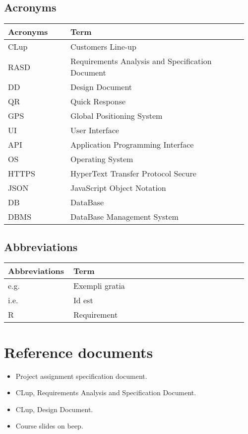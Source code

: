 \subsection{Acronyms}
\begin{center}
	\begin{tabular}{@{}p{0.25\linewidth} p{0.71\linewidth}@{}}
		\toprule
		\textbf{Acronyms} & \textbf{Term}\\
		\midrule
		CLup & Customers Line-up\\
		RASD & Requirements Analysis and Specification Document\\
		DD & Design Document\\
		QR & Quick Response\\
		GPS & Global Positioning System\\
		UI & User Interface\\
		API & Application Programming Interface\\
		OS & Operating System\\
		HTTPS & HyperText Transfer Protocol Secure\\
		JSON & JavaScript Object Notation\\	
		DB & DataBase\\
		DBMS & DataBase Management System\\
		\bottomrule
	\end{tabular}
\end{center}

\subsection{Abbreviations}
\begin{center}
	\begin{tabular}{@{}p{0.25\linewidth} p{0.71\linewidth}@{}}
		\toprule
		\textbf{Abbreviations} & \textbf{Term}\\
		\midrule
		e.g. & Exempli gratia\\
		i.e. & Id est\\
		R & Requirement\\		
		\bottomrule
	\end{tabular}
\end{center}

\section{Reference documents}
\begin{itemize}
	\item Project assignment specification document.
    \item CLup, Requirements Analysis and Specification Document.
    \item CLup, Design Document.
	\item Course slides on beep.
\end{itemize}

